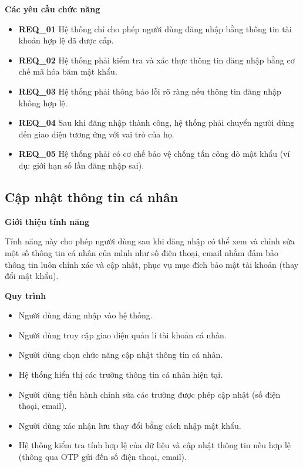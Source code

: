 \noindent \textbf{Các yêu cầu chức năng}

\begin{itemize}

  \item \textbf{REQ\_01} Hệ thống chỉ cho phép người dùng đăng nhập bằng thông tin tài khoản hợp lệ đã được cấp.

  \item \textbf{REQ\_02} Hệ thống phải kiểm tra và xác thực thông tin đăng nhập bằng cơ chế mã hóa băm mật khẩu.

  \item \textbf{REQ\_03} Hệ thống phải thông báo lỗi rõ ràng nếu thông tin đăng nhập không hợp lệ.

  \item \textbf{REQ\_04} Sau khi đăng nhập thành công, hệ thống phải chuyển người dùng đến giao diện tương ứng với vai trò của họ.

  \item \textbf{REQ\_05} Hệ thống phải có cơ chế bảo vệ chống tấn công dò mật khẩu (ví dụ: giới hạn số lần đăng nhập sai).

\end{itemize}

\subsection{Cập nhật thông tin cá nhân}

\noindent \textbf{Giới thiệu tính năng}

Tính năng này cho phép người dùng sau khi đăng nhập có thể xem và chỉnh sửa một số thông tin cá nhân của mình như số điện thoại, email nhằm đảm bảo thông tin luôn chính xác và cập nhật, phục vụ mục đích bảo mật tài khoản (thay đổi mật khẩu).

\noindent \textbf{Quy trình}

\begin{itemize}

  \item Người dùng đăng nhập vào hệ thống.

  \item Người dùng truy cập giao diện quản lí tài khoản cá nhân.

  \item Người dùng chọn chức năng cập nhật thông tin cá nhân.

  \item Hệ thống hiển thị các trường thông tin cá nhân hiện tại.

  \item Người dùng tiến hành chỉnh sửa các trường được phép cập nhật (số điện thoại, email).

  \item Người dùng xác nhận lưu thay đổi bằng cách nhập mật khẩu.

  \item Hệ thống kiểm tra tính hợp lệ của dữ liệu và cập nhật thông tin nếu hợp lệ (thông qua OTP gửi đến số điện thoại, email).

\end{itemize}


